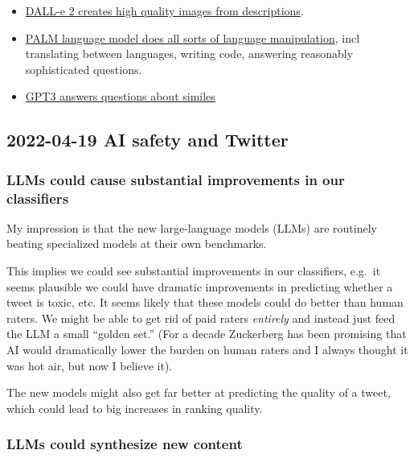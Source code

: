 \documentclass[
  11pt,
  letterpaper,
  DIV=11,
  numbers=noendperiod,
  oneside]{scrartcl}
\begin{document}
\begin{itemize}
\item
  \href{https://twitter.com/BecomingCritter/status/1511808277490896903}{DALL-e
  2 creates high quality images from descriptions}.
\item
  \href{https://ai.googleblog.com/2022/04/pathways-language-model-palm-scaling-to.html}{PALM
  language model does all sorts of language manipulation}, incl
  translating between languages, writing code, answering reasonably
  sophisticated questions.
\item
  \href{https://twitter.com/RichardMCNgo/status/1513218637984776193}{GPT3
  answers questions about similes}
\end{itemize}

\hypertarget{ai-safety-and-twitter}{%
\subsection{2022-04-19 \textbar{} AI safety and
Twitter}\label{ai-safety-and-twitter}}

\hypertarget{llms-could-cause-substantial-improvements-in-our-classifiers}{%
\subsubsection{LLMs could cause substantial improvements in our
classifiers}\label{llms-could-cause-substantial-improvements-in-our-classifiers}}

My impression is that the new large-language models (LLMs) are routinely
beating specialized models at their own benchmarks.

This implies we could see substantial improvements in our classifiers,
e.g.~it seems plausible we could have dramatic improvements in
predicting whether a tweet is toxic, etc. It seems likely that these
models could do better than human raters. We might be able to get rid of
paid raters \emph{entirely} and instead just feed the LLM a small
``golden set.'' (For a decade Zuckerberg has been promising that AI
would dramatically lower the burden on human raters and I always thought
it was hot air, but now I believe it).

The new models might also get far better at predicting the quality of a
tweet, which could lead to big increases in ranking quality.

\hypertarget{llms-could-synthesize-new-content}{%
\subsubsection{LLMs could synthesize new
content}\label{llms-could-synthesize-new-content}}
\end{document}
